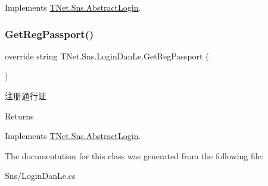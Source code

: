 Implements \mbox{\hyperlink{class_t_net_1_1_sns_1_1_abstract_login_a6b5dac3d6d46efb7b1e4049e674105e5}{T\+Net.\+Sns.\+Abstract\+Login}}.

\mbox{\label{class_t_net_1_1_sns_1_1_login_dan_le_a8f4d8299a72d87be61454902c240f2a2}} 
\subsubsection{\texorpdfstring{Get\+Reg\+Passport()}{GetRegPassport()}}
{\footnotesize\ttfamily override string T\+Net.\+Sns.\+Login\+Dan\+Le.\+Get\+Reg\+Passport (\begin{DoxyParamCaption}{ }\end{DoxyParamCaption})\hspace{0.3cm}{\ttfamily [virtual]}}



注册通行证 

\begin{DoxyReturn}{Returns}

\end{DoxyReturn}


Implements \mbox{\hyperlink{class_t_net_1_1_sns_1_1_abstract_login_a3930eb564bb4804e1b646d749f20907a}{T\+Net.\+Sns.\+Abstract\+Login}}.



The documentation for this class was generated from the following file\+:\begin{DoxyCompactItemize}
\item 
Sns/Login\+Dan\+Le.\+cs\end{DoxyCompactItemize}
